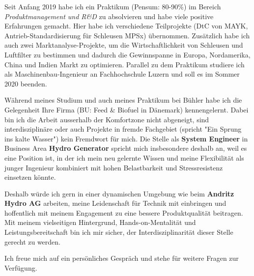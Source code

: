 \documentclass[11pt, a4paper]{awesome-cv}
\newcommand{\companyName}{Andritz Hydro AG}
\newcommand{\jobPosition}{System Engineer}
\begin{document}
\makecvheader

\makelettertitle

\begin{cvletter}
	
Seit Anfang 2019 habe ich ein Praktikum (Pensum: 80-90\%) im Bereich \textit{Produktmanagement und R\&D} zu absolvieren und habe viele positive Erfahrungen gemacht. Hier habe ich verschiedene Teilprojekte (DtC von MAYK, Antrieb-Standardisierung für Schleusen MPSx) übernommen. Zusätzlich habe ich auch zwei Marktanalyse-Projekte, um die Wirtschaftlichkeit von Schleusen und Luftfilter zu bestimmen und dadurch die Gewinnspanne in Europa, Nordamerika, China und Indien Markt zu optimieren. Parallel zu dem Praktikum studiere ich als Maschinenbau-Ingenieur an Fachhochschule Luzern und soll es im Sommer 2020 beenden.

Während meines Studium und auch meines Praktikum bei Bühler habe ich die Gelegenheit Ihre Firma (BU: Feed \& Biofuel in Dänemark) kennengelernt. Dabei bin ich die Arbeit ausserhalb der Komfortzone nicht abgeneigt, sind interdisziplinäre oder auch Projekte in fremde Fachgebiet (spricht "Ein Sprung ins kalte Wasser") kein Fremdwort für mich. Die Stelle als \textbf{\jobPosition} in Business Area \textbf{Hydro Generator} spricht mich insbesondere deshalb an, weil es eine Position ist, in der ich mein neu gelernte Wissen und meine Flexibilität als junger Ingenieur kombiniert mit hohen Belastbarkeit und Stressresistenz einsetzen könnte. 

Deshalb würde ich gern in einer dynamischen Umgebung wie beim \textbf{\companyName} arbeiten, meine Leidenschaft für Technik mit einbringen und hoffentlich mit meinem Engagement zu eine bessere Produktqualität beitragen. Mit meinem vielseitigen Hintergrund, Hands-on-Mentalität und Leistungsbereitschaft bin ich mir sicher, der Interdisziplinarität dieser Stelle gerecht zu werden. 

Ich freue mich auf ein persönliches Gespräch und stehe für weitere Fragen zur Verfügung.

\end{cvletter}

\makeletterclosing
\end{document}
